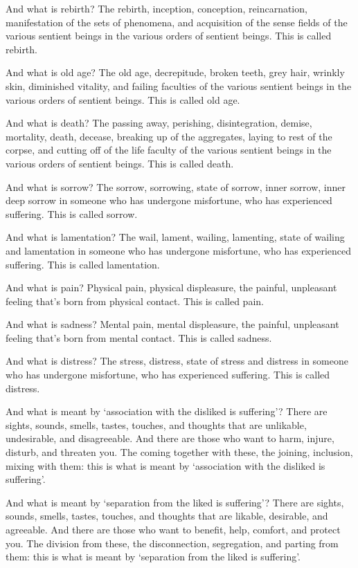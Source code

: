 \documentclass[12pt,openany]{book}%
\begin{document}
And what is rebirth? The rebirth, inception, conception, reincarnation, manifestation of the sets of phenomena, and acquisition of the sense fields of the various sentient beings in the various orders of sentient beings. This is called rebirth. 

And what is old age? The old age, decrepitude, broken teeth, grey hair, wrinkly skin, diminished vitality, and failing faculties of the various sentient beings in the various orders of sentient beings. This is called old age. 

And what is death? The passing away, perishing, disintegration, demise, mortality, death, decease, breaking up of the aggregates, laying to rest of the corpse, and cutting off of the life faculty of the various sentient beings in the various orders of sentient beings. This is called death. 

And what is sorrow? The sorrow, sorrowing, state of sorrow, inner sorrow, inner deep sorrow in someone who has undergone misfortune, who has experienced suffering. This is called sorrow. 

And what is lamentation? The wail, lament, wailing, lamenting, state of wailing and lamentation in someone who has undergone misfortune, who has experienced suffering. This is called lamentation. 

And what is pain? Physical pain, physical displeasure, the painful, unpleasant feeling that’s born from physical contact. This is called pain. 

And what is sadness? Mental pain, mental displeasure, the painful, unpleasant feeling that’s born from mental contact. This is called sadness. 

And what is distress? The stress, distress, state of stress and distress in someone who has undergone misfortune, who has experienced suffering. This is called distress. 

And what is meant by ‘association with the disliked is suffering’? There are sights, sounds, smells, tastes, touches, and thoughts that are unlikable, undesirable, and disagreeable. And there are those who want to harm, injure, disturb, and threaten you. The coming together with these, the joining, inclusion, mixing with them: this is what is meant by ‘association with the disliked is suffering’. 

And what is meant by ‘separation from the liked is suffering’? There are sights, sounds, smells, tastes, touches, and thoughts that are likable, desirable, and agreeable. And there are those who want to benefit, help, comfort, and protect you. The division from these, the disconnection, segregation, and parting from them: this is what is meant by ‘separation from the liked is suffering’. 
\end{document}
